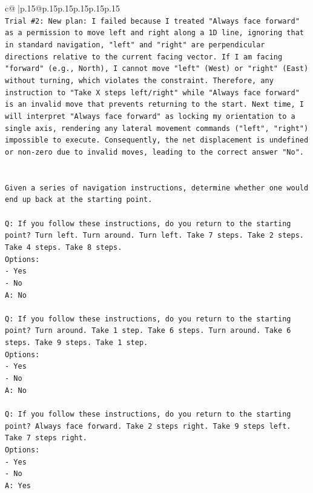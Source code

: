 \documentclass{article}
\begin{document}
{\begin{supertabular}{c@{$\;$}|p{.15\linewidth}@{}p{.15\linewidth}p{.15\linewidth}p{.15\linewidth}p{.15\linewidth}p{.15\linewidth}}
{{{\\ 
\texttt{Trial \#2: New plan: I failed because I treated "Always face forward" as a permission to move left and right along a 1D line, ignoring that in standard navigation, "left" and "right" are perpendicular directions relative to the current facing vector. If I am facing "forward" (e.g., North), I cannot move "left" (West) or "right" (East) without turning, which violates the constraint. Therefore, any instruction to "Take X steps left/right" while "Always face forward" is an invalid move that prevents returning to the start. Next time, I will interpret "Always face forward" as locking my orientation to a single axis, rendering any lateral movement commands ("left", "right") impossible to execute. Consequently, the net displacement is undefined or non{-}zero due to invalid moves, leading to the correct answer "No".} \\
\\ 
\\ 
\texttt{Given a series of navigation instructions, determine whether one would end up back at the starting point.} \\
\\ 
\texttt{Q: If you follow these instructions, do you return to the starting point? Turn left. Turn around. Turn left. Take 7 steps. Take 2 steps. Take 4 steps. Take 8 steps.} \\
\texttt{Options:} \\
\texttt{{-} Yes} \\
\texttt{{-} No} \\
\texttt{A: No} \\
\\ 
\texttt{Q: If you follow these instructions, do you return to the starting point? Turn around. Take 1 step. Take 6 steps. Turn around. Take 6 steps. Take 9 steps. Take 1 step.} \\
\texttt{Options:} \\
\texttt{{-} Yes} \\
\texttt{{-} No} \\
\texttt{A: No} \\
\\ 
\texttt{Q: If you follow these instructions, do you return to the starting point? Always face forward. Take 2 steps right. Take 9 steps left. Take 7 steps right.} \\
\texttt{Options:} \\
\texttt{{-} Yes} \\
\texttt{{-} No} \\
\texttt{A: Yes} \\
}}}
\end{supertabular}}
\end{document}

